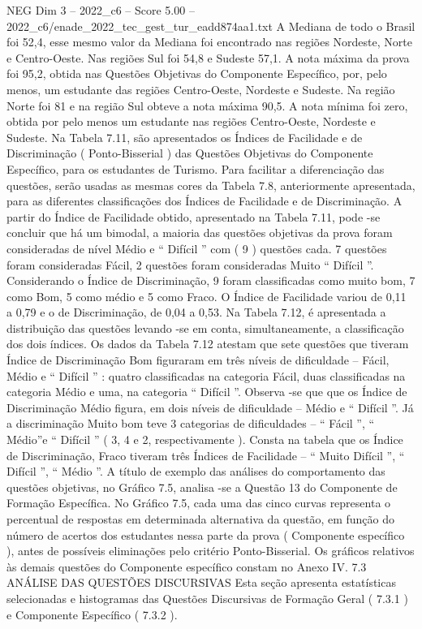 \begin{textsample}{NEG Dim 3 – 2022\_c6 – Score 5.00 – 2022\_c6/enade\_2022\_tec\_gest\_tur\_eadd874aa1.txt}
A Mediana de todo o Brasil foi 52,4, esse mesmo valor da Mediana foi encontrado nas regiões Nordeste, Norte e Centro-Oeste.
Nas regiões Sul foi 54,8 e Sudeste 57,1.
A nota máxima da prova foi 95,2, obtida nas Questões Objetivas do Componente Específico, por, pelo menos, um estudante das regiões Centro-Oeste, Nordeste e Sudeste.
Na região Norte foi 81 e na região Sul obteve a nota máxima 90,5.
A nota mínima foi zero, obtida por pelo menos um estudante nas regiões Centro-Oeste, Nordeste e Sudeste.
Na Tabela 7.11, são apresentados os Índices de Facilidade e de Discriminação ( Ponto-Bisserial ) das Questões Objetivas do Componente Específico, para os estudantes de Turismo.
Para facilitar a diferenciação das questões, serão usadas as mesmas cores da Tabela 7.8, anteriormente apresentada, para as diferentes classificações dos Índices de Facilidade e de Discriminação.
A partir do Índice de Facilidade obtido, apresentado na Tabela 7.11, pode -se concluir que há um bimodal, a maioria das questões objetivas da prova foram consideradas de nível Médio e “ Difícil ” com ( 9 ) questões cada. 7 questões foram consideradas Fácil, 2 questões foram consideradas Muito “ Difícil ”.
Considerando o Índice de Discriminação, 9 foram classificadas como muito bom, 7 como Bom, 5 como médio e 5 como Fraco.
O Índice de Facilidade variou de 0,11 a 0,79 e o de Discriminação, de 0,04 a 0,53.
Na Tabela 7.12, é apresentada a distribuição das questões levando -se em conta, simultaneamente, a classificação dos dois índices.
Os dados da Tabela 7.12 atestam que sete questões que tiveram Índice de Discriminação Bom figuraram em três níveis de dificuldade – Fácil, Médio e “ Difícil ” : quatro classificadas na categoria Fácil, duas classificadas na categoria Médio e uma, na categoria “ Difícil ”.
Observa -se que que os Índice de Discriminação Médio figura, em dois níveis de dificuldade – Médio e “ Difícil ”.
Já a discriminação Muito bom teve 3 categorias de dificuldades – “ Fácil ”, “ Médio”e “ Difícil ” ( 3, 4 e 2, respectivamente ).
Consta na tabela que os Índice de Discriminação, Fraco tiveram três Índices de Facilidade – “ Muito Difícil ”, “ Difícil ”, “ Médio ”.
A título de exemplo das análises do comportamento das questões objetivas, no Gráfico 7.5, analisa -se a Questão 13 do Componente de Formação Específica.
No Gráfico 7.5, cada uma das cinco curvas representa o percentual de respostas em determinada alternativa da questão, em função do número de acertos dos estudantes nessa parte da prova ( Componente específico ), antes de possíveis eliminações pelo critério Ponto-Bisserial.
Os gráficos relativos às demais questões do Componente específico constam no Anexo IV. 7.3 ANÁLISE DAS QUESTÕES DISCURSIVAS Esta seção apresenta estatísticas selecionadas e histogramas das Questões Discursivas de Formação Geral ( 7.3.1 ) e Componente Específico ( 7.3.2 ).

\end{textsample}
